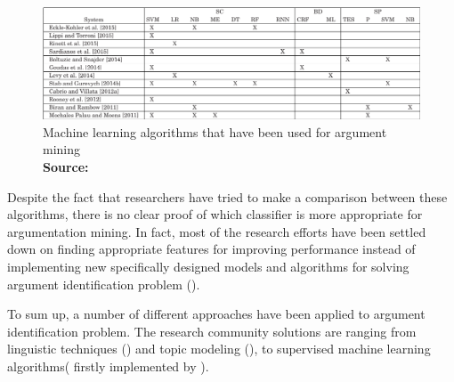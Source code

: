 \begin{figure}[!h]
	\begin{center}
		\includegraphics[scale=0.4]{images/Statistical-techniques_used.png}
	\end{center}
	\caption{
		Machine learning algorithms that have been used for argument mining
		\\
		\textbf{Source:} \cite{Lippi2016}
	}
	\label{Machine_learning_algorithms}
\end{figure}

Despite the fact that researchers have tried to make a comparison between these algorithms, there is no clear proof of which classifier is more appropriate for argumentation mining. In fact, most of the research efforts have been settled down on finding appropriate features for improving performance instead of implementing new specifically designed models and algorithms for solving argument identification problem (\cite{Lippi2016}). \par

To sum up, a number of different approaches have been applied to argument identification problem. The research community solutions are ranging from linguistic techniques (\cite{GarciaVillalba2012}) and topic modeling (\cite{Lawrence2014}), to supervised machine learning algorithms( firstly implemented by \cite{Moens2007}). \par

